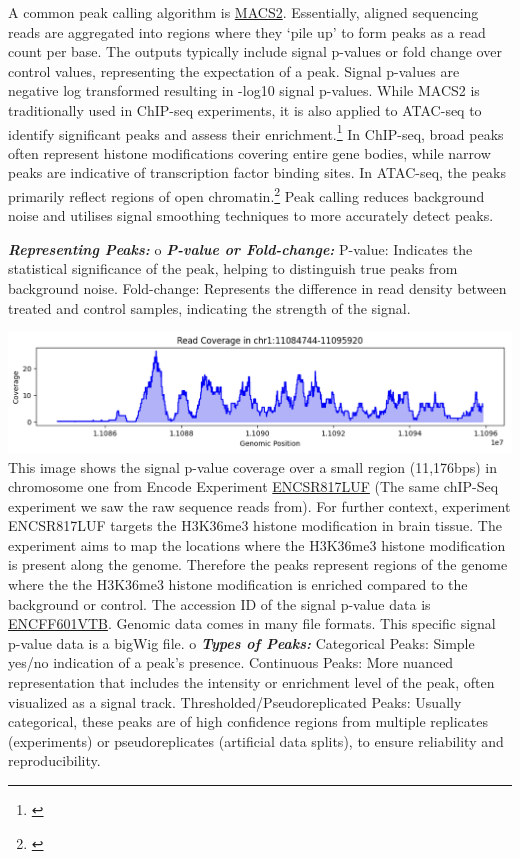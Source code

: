 \documentclass[
]{book}
\begin{document}
A common peak calling algorithm is \href{https://hbctraining.github.io/Intro-to-ChIPseq/lessons/05_peak_calling_macs.html}{MACS2}. Essentially, aligned sequencing reads are aggregated into regions where they `pile up' to form peaks as a read count per base. The outputs typically include signal p-values or fold change over control values, representing the expectation of a peak. Signal p-values are negative log transformed resulting in -log10 signal p-values. While MACS2 is traditionally used in ChIP-seq experiments, it is also applied to ATAC-seq to identify significant peaks and assess their enrichment.\footnote{\citet{mistry2022}} In ChIP-seq, broad peaks often represent histone modifications covering entire gene bodies, while narrow peaks are indicative of transcription factor binding sites. In ATAC-seq, the peaks primarily reflect regions of open chromatin.\footnote{\citet{wilbanks2010}} Peak calling reduces background noise and utilises signal smoothing techniques to more accurately detect peaks.

\textbf{\emph{Representing Peaks:}}
o \textbf{\emph{P-value or Fold-change:}}
P-value: Indicates the statistical significance of the peak, helping to distinguish true peaks from background noise.
Fold-change: Represents the difference in read density between treated and control samples, indicating the strength of the signal.

\includegraphics{images/coverage_p.png}
This image shows the signal p-value coverage over a small region (11,176bps) in chromosome one from Encode Experiment \href{https://www.encodeproject.org/experiments/ENCSR817LUF/}{ENCSR817LUF} (The same chIP-Seq experiment we saw the raw sequence reads from). For further context, experiment ENCSR817LUF targets the H3K36me3 histone modification in brain tissue. The experiment aims to map the locations where the H3K36me3 histone modification is present along the genome. Therefore the peaks represent regions of the genome where the the H3K36me3 histone modification is enriched compared to the background or control. The accession ID of the signal p-value data is \href{https://www.encodeproject.org/files/ENCFF601VTB/}{ENCFF601VTB}. Genomic data comes in many file formats. This specific signal p-value data is a bigWig file.
o \textbf{\emph{Types of Peaks:}}
Categorical Peaks: Simple yes/no indication of a peak's presence.
Continuous Peaks: More nuanced representation that includes the intensity or enrichment level of the peak, often visualized as a signal track.
Thresholded/Pseudoreplicated Peaks: Usually categorical, these peaks are of high confidence regions from multiple replicates (experiments) or pseudoreplicates (artificial data splits), to ensure reliability and reproducibility.
\end{document}
